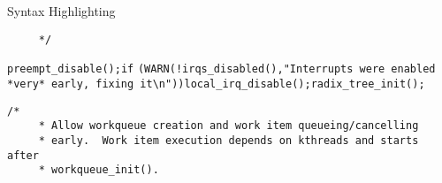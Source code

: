 \begin{frame}{Syntax Highlighting}
\begin{verbatim}
	 */\end{verbatim}\leavevmode\newline\tab\color{Aquamarine}\verb$preempt_disable$\color{Fuchsia}\verb$($\color{Fuchsia}\verb$)$\color{Fuchsia}\verb$;$\newline\tab\color{BurntOrange}\verb$if$ \color{Fuchsia}\verb$($\color{Aquamarine}\verb$WARN$\color{Fuchsia}\verb$($\color{Goldenrod}\verb$!$\color{Aquamarine}\verb$irqs_disabled$\color{Fuchsia}\verb$($\color{Fuchsia}\verb$)$\color{Fuchsia}\verb$,$\newline\tab\tab \color{Emerald}\verb$"Interrupts were enabled *very* early, fixing it\n"$\color{Fuchsia}\verb$)$\color{Fuchsia}\verb$)$\newline\tab\tab\color{Aquamarine}\verb$local_irq_disable$\color{Fuchsia}\verb$($\color{Fuchsia}\verb$)$\color{Fuchsia}\verb$;$\newline\tab\color{Aquamarine}\verb$radix_tree_init$\color{Fuchsia}\verb$($\color{Fuchsia}\verb$)$\color{Fuchsia}\verb$;$\newline\newline\tab\color{Rhodamine}\begin{verbatim}/*
	 * Allow workqueue creation and work item queueing/cancelling
	 * early.  Work item execution depends on kthreads and starts after
	 * workqueue_init().

\end{verbatim}
\end{frame}
